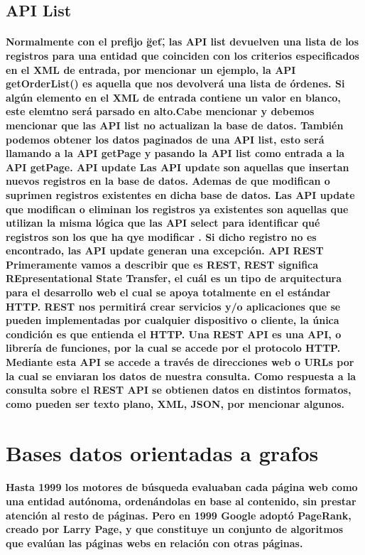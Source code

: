   \subsection{API List}
    \paragraph{Normalmente con el prefijo \"get\", las API list devuelven una lista de los registros para una entidad que coinciden con los criterios especificados en el XML de entrada, por mencionar un ejemplo, la API getOrderList() es aquella que nos devolverá una lista de órdenes. Si algún elemento en el XML de entrada contiene un valor en blanco, este elemtno será parsado en alto.Cabe mencionar y debemos mencionar que las API list no actualizan la base de datos. También podemos obtener los datos paginados de una API list, esto será llamando a la API getPage y pasando la API list como entrada a la API getPage. API update Las API update son aquellas que insertan nuevos registros en la base de datos. Ademas de que modifican o suprimen registros existentes en dicha base de datos. Las API update que modifican o eliminan los registros ya existentes son aquellas que utilizan la misma lógica que las API select para identificar qué registros son los que ha qye modificar . Si dicho registro no es encontrado, las API update generan una excepción. API REST Primeramente vamos a describir que es REST, REST significa REpresentational State Transfer, el cuál es un tipo de arquitectura para el desarrollo web el cual se apoya totalmente en el estándar HTTP. REST nos permitirá crear servicios y/o aplicaciones que se pueden implementadas por cualquier dispositivo o cliente, la única condición es que entienda el HTTP. Una REST API es una API, o librería de funciones, por la cual se accede por el protocolo HTTP. Mediante esta API se accede a través de direcciones web o URLs por la cual se enviaran los datos de nuestra consulta. Como respuesta a la consulta sobre el REST API se obtienen datos en distintos formatos, como pueden ser texto plano, XML, JSON, por mencionar algunos. }
\newpage
 \section{Bases datos orientadas a grafos}
 \paragraph{Hasta 1999 los motores de búsqueda evaluaban cada página web como una entidad autónoma, ordenándolas en base al contenido, sin prestar atención al resto de páginas. Pero en 1999 Google adoptó PageRank, creado por Larry Page, y que constituye un conjunto de algoritmos que evalúan las páginas webs en relación con otras páginas.}

